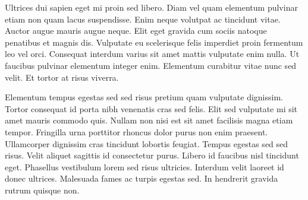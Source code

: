 \documentclass[10pt]{article}
\begin{document}
\begin{multicols}{2}
Ultrices dui sapien eget mi proin sed libero. Diam vel quam elementum pulvinar etiam non quam lacus suspendisse. Enim neque volutpat ac tincidunt vitae. Auctor augue mauris augue neque. Elit eget gravida cum sociis natoque penatibus et magnis dis. Vulputate eu scelerisque felis imperdiet proin fermentum leo vel orci. Consequat interdum varius sit amet mattis vulputate enim nulla. Ut faucibus pulvinar elementum integer enim. Elementum curabitur vitae nunc sed velit. Et tortor at risus viverra.

Elementum tempus egestas sed sed risus pretium quam vulputate dignissim. Tortor consequat id porta nibh venenatis cras sed felis. Elit sed vulputate mi sit amet mauris commodo quis. Nullam non nisi est sit amet facilisis magna etiam tempor. Fringilla urna porttitor rhoncus dolor purus non enim praesent. Ullamcorper dignissim cras tincidunt lobortis feugiat. Tempus egestas sed sed risus. Velit aliquet sagittis id consectetur purus. Libero id faucibus nisl tincidunt eget. Phasellus vestibulum lorem sed risus ultricies. Interdum velit laoreet id donec ultrices. Malesuada fames ac turpis egestas sed. In hendrerit gravida rutrum quisque non.

\end{multicols}
\end{document}
